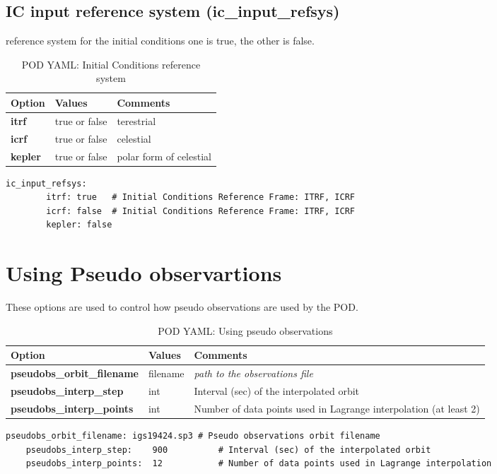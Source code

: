 \subsection{IC input reference system (ic\_input\_refsys)}
reference system for the initial conditions one is true, the other is false. 
\begin{table}[h!]
	\begin{tabular}{|p{4.5cm}|p{2cm}|p{3.5cm}|}
		\hline
		Option & Values & Comments \\
		\hline
		\textbf{itrf} & true or false & terestrial\\
		\textbf{icrf} & true or false & celestial \\
		\textbf{kepler} & true or false & polar form of celestial\\
		\hline
	\end{tabular}
	\caption{POD YAML: Initial Conditions reference system}
	\label{table:pod_yaml_ic_ref_system}
\end{table}
%
\begin{lstlisting}[language=xml,caption=ic\_input\_refsys yaml configuration example]
   ic_input_refsys:
		itrf: true   # Initial Conditions Reference Frame: ITRF, ICRF
		icrf: false  # Initial Conditions Reference Frame: ITRF, ICRF
		kepler: false
\end{lstlisting}
%
\section{Using Pseudo observartions}
These options are used to control how pseudo observations are used by the POD.
 
\begin{table}[h!]
	\begin{tabular}{|p{4.5cm}|p{2cm}|p{3.5cm}|}
		\hline
		Option & Values & Comments \\
		\hline
		\textbf{pseudobs\_orbit\_filename} & filename & \emph{path to the observations file}\\
		\textbf{pseudobs\_interp\_step} & int &  Interval (sec) of the interpolated orbit\\
		\textbf{pseudobs\_interp\_points} & int & Number of data points used in Lagrange interpolation (at least 2)\\
		\hline
	\end{tabular}
	\caption{POD YAML: Using pseudo observations}
	\label{table:pod_yaml_pseudo_obs}
\end{table}
%
\begin{lstlisting}[language=xml,caption=pseudo observation model yaml configuration example]
	pseudobs_orbit_filename: igs19424.sp3 # Pseudo observations orbit filename
	pseudobs_interp_step:    900          # Interval (sec) of the interpolated orbit
	pseudobs_interp_points:  12           # Number of data points used in Lagrange interpolation
\end{lstlisting}
%

